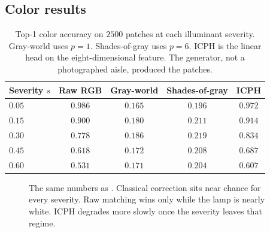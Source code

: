 \subsection{Color results}
\label{sec:color-results}

\begin{table}[t]
\centering
\caption{Top-1 color accuracy on $2500$ patches at each illuminant severity. Gray-world uses $p=1$. Shades-of-gray uses $p=6$. ICPH is the linear head on the eight-dimensional feature. The generator, not a photographed aisle, produced the patches.}
\label{tab:color}
\small
\begin{tabular}{@{}lcccc@{}}
\toprule
Severity $s$ & Raw RGB & Gray-world & Shades-of-gray & ICPH \\
\midrule
$0.05$ & $0.986$ & $0.165$ & $0.196$ & $0.972$ \\
$0.15$ & $0.900$ & $0.180$ & $0.211$ & $0.914$ \\
$0.30$ & $0.778$ & $0.186$ & $0.219$ & $0.834$ \\
$0.45$ & $0.618$ & $0.172$ & $0.208$ & $0.687$ \\
$0.60$ & $0.531$ & $0.171$ & $0.204$ & $0.607$ \\
\bottomrule
\end{tabular}
\end{table}

\begin{figure}[t]
\centering
{}
\caption{The same numbers as . Classical correction sits near chance for every severity. Raw matching wins only while the lamp is nearly white. ICPH degrades more slowly once the severity leaves that regime.}
\label{fig:color-curve}
\end{figure}

